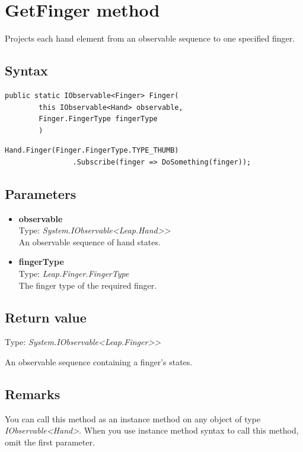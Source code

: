 \documentclass[12pt,a4paper,twoside]{report}
\begin{document}
\section{GetFinger method}
Projects each hand element from an observable sequence to one specified finger.

\subsection{Syntax}
\begin{lstlisting}[caption=Declaration]
     public static IObservable<Finger> Finger(
        this IObservable<Hand> observable,
        Finger.FingerType fingerType
        )
\end{lstlisting}

\begin{lstlisting}[caption=Usage example]
     Hand.Finger(Finger.FingerType.TYPE_THUMB)
                .Subscribe(finger => DoSomething(finger));
\end{lstlisting}

\subsection{Parameters}
\begin{itemize}
    \item \textbf{observable}\\
        Type: \textit{System.IObservable<Leap.Hand>{}>}\\
        An observable sequence of hand states.
    \item \textbf{fingerType}\\
        Type: \textit{Leap.Finger.FingerType}\\
        The finger type of the required finger.
\end{itemize}

\subsection{Return value}
Type: \textit{System.IObservable<Leap.Finger>{}>}

An observable sequence containing a finger's states.

\subsection{Remarks}
You can call this method as an instance method on any object of type \textit{IObservable<Hand>}. When you use 
instance method syntax to call this method, omit the first parameter.
\end{document}

